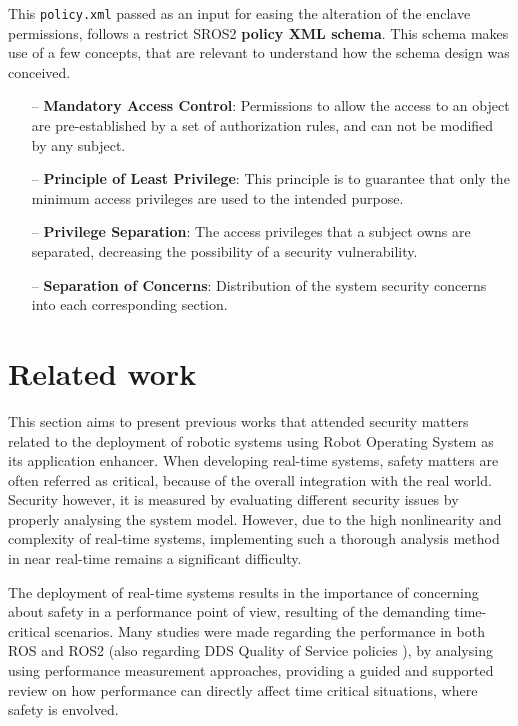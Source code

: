 This \texttt{policy.xml} passed as an input for easing the alteration of the enclave permissions, follows a restrict SROS2 \textbf{policy XML schema}. This schema makes use of a few concepts, that are relevant to understand how the schema design was conceived.

\begin{itemize}
    \item[--] \textbf{Mandatory Access Control}: Permissions to allow the access to an object are pre-established by a set of authorization rules, and can not be modified by any subject.  
    \item[--] \textbf{Principle of Least Privilege}: This principle is to guarantee that only the minimum access privileges are used to the intended purpose.
    \item[--] \textbf{Privilege Separation}: The access privileges that a subject owns are separated, decreasing the possibility of a security vulnerability.
    \item[--] \textbf{Separation of Concerns}: Distribution of the system security concerns into each corresponding section.  
\end{itemize}
                
                


\section{Related work}\label{s:ros-relWork}

This section aims to present previous works that attended security matters related to the deployment of robotic systems using Robot Operating System as its application enhancer. When developing real-time systems, safety matters are often referred as critical, because of the overall integration with the real world. Security however, it is measured by evaluating different security issues by properly analysing the system model. However, due to the high nonlinearity and complexity of real-time systems, implementing such a thorough analysis method in near real-time remains a significant difficulty.\cite{diao2009design}

The deployment of real-time systems results in the importance of concerning about safety in a performance point of view, resulting of the demanding time-critical scenarios. Many studies were made regarding the performance in both ROS and ROS2 (also regarding DDS Quality of Service policies \cite{maruyama2016exploring}), by analysing using performance measurement approaches, providing a guided and supported review on how performance can directly affect time critical situations, where safety is envolved.\cite{maruyama2016exploring, casini2019response} 

